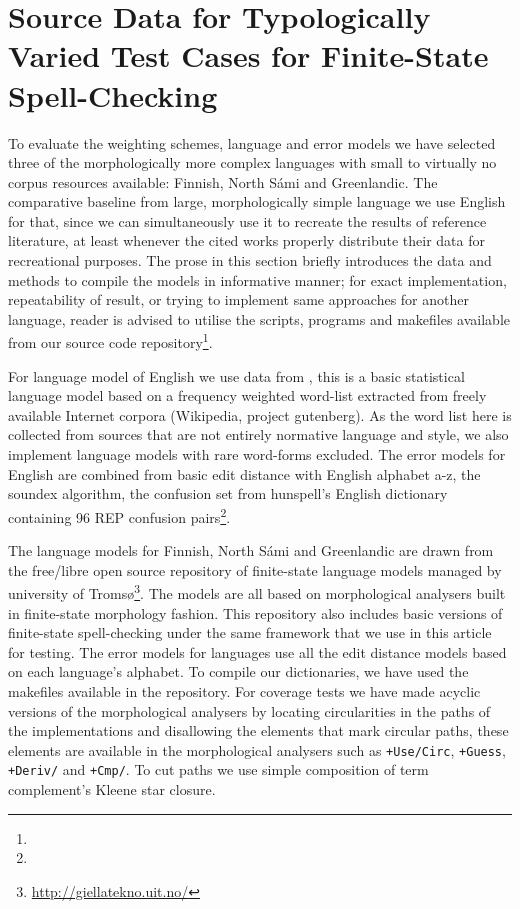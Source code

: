 \documentclass[a4paper,12pt]{article}
\begin{document}
\section{Source Data for Typologically Varied Test Cases for Finite-State
Spell-Checking}
\label{sec:material}

To evaluate the weighting schemes, language and error models we have selected
three of the morphologically more complex languages with small to virtually no
corpus resources available: Finnish, North Sámi and Greenlandic. The
comparative baseline from large, morphologically simple language we use English
for that, since we can simultaneously use it to recreate the results of
reference literature, at least whenever the cited works properly distribute
their data for recreational purposes. The prose in this section briefly
introduces the data and methods to compile the models in informative manner;
for exact implementation, repeatability of result, or trying to implement same
approaches for another language, reader is advised to utilise the scripts,
programs and makefiles available from our source code
repository\footnote{}.

For language model of English we use data from
\cite{norvig/2010,pirinen2012effects}, this is a basic statistical language
model based on a frequency weighted word-list extracted from freely available
Internet corpora (Wikipedia, project gutenberg). As the word list here is
collected from sources that are not entirely normative language and style, we
also implement language models with rare word-forms excluded. The error models
for English are combined from basic edit distance with English alphabet a-z,
the soundex algorithm, the confusion set from hunspell's English dictionary
containing 96 REP confusion pairs\footnote{}.

The language models for Finnish, North Sámi and Greenlandic are drawn from the
free/libre open source repository of finite-state language models managed by
university of Tromsø\footnote{\url{http://giellatekno.uit.no/}}. The models are all based on morphological analysers built in
finite-state morphology \cite{beesley2003finite} fashion. This repository also
includes basic versions of finite-state spell-checking under the same framework
that we use in this article for testing. The error models for languages use all
the edit distance models based on each language's alphabet. To compile
our dictionaries, we have used the makefiles available in the repository.
For coverage tests we have made acyclic versions of the morphological
analysers by locating circularities in the paths of the implementations
and disallowing the elements that mark circular paths, these elements are
available in the morphological analysers such as \texttt{+Use/Circ}, 
\texttt{+Guess}, \texttt{+Deriv/} and \texttt{+Cmp/}. To cut paths we use
simple composition of term complement's Kleene star closure.
\end{document}
